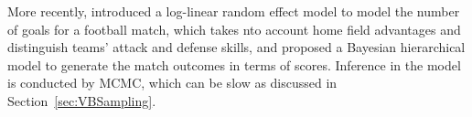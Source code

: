 More recently, \cite{Baio:10JAS} introduced a log-linear random effect model to model the number of goals for a football match, which takes nto account home field advantages and distinguish teams' attack and defense skills, and proposed a Bayesian hierarchical model to generate the match outcomes in terms of scores. Inference in the model is conducted by MCMC, which can be slow as discussed in Section~\ref{sec:VBSampling}.